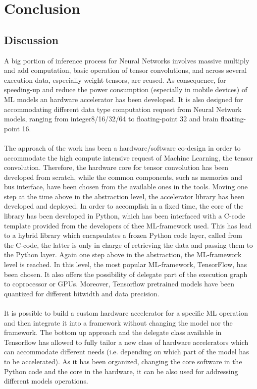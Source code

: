 \chapter{Conclusion}

\section{Discussion}A big portion of inference process for Neural Networks involves massive multiply and add computation, basic operation of tensor convolutions, and across several execution data, especially weight tensors, are reused.
As consequence, for speeding-up and reduce the power consumption (especially in mobile devices) of ML models an hardware accelerator has been developed.
It is also designed for accommodating different data type computation request from Neural Network models, ranging from integer8/16/32/64 to floating-point 32 and brain floating-point 16.\\\\

The approach of the work has been a hardware/software co-design in order to accommodate the high compute intensive request of Machine Learning, the tensor convolution. Therefore, the hardware core for tensor convolution has been developed from scratch, while the common components, such as memories and bus interface, have been chosen from the available ones in the tools.
Moving one step at the time above in the abstraction level, the accelerator library has been developed and deployed. In order to accomplish in a fixed time, the core of the library has been developed in Python, which has been interfaced with a C-code template provided from the developers of thee ML-framework used. This has lead to a hybrid library which encapsulates a frozen Python code layer, called from the C-code, the latter is only in charge of retrieving the data and passing them to the Python layer.
Again one step above in the abstraction, the ML-framework level is reached. In this level, the most popular ML-framework, TensorFlow, has been chosen. It also offers the possibility of delegate part of the execution graph to coprocessor or GPUs. Moreover, Tensorflow pretrained models have been quantized for different bitwidth and data precision.\\\\

It is possible to build a custom hardware accelerator for a specific ML operation and then integrate it into a framework without changing the model nor the framework.
The bottom up approach and the delegate class available in Tensorflow has allowed to fully tailor a new class of hardware accelerators which can accommodate different needs (i.e. depending on which part of the model has to be accelerated). As it has been organized, changing the core software in the Python code and the core in the hardware, it can be also used for addressing different models operations.

